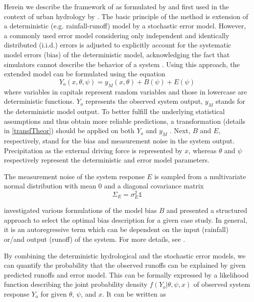 \documentclass{ctuthesis}\usepackage[]{graphicx}\usepackage[]{color}
\begin{document}
Herein we describe the framework of \cite{kennedy2001bayesian} as formulated by \cite{reichert2012linking} and first used in the context of urban hydrology by \cite{giudice2013improving}. The basic principle of the method is extension of a deterministic (e.g. rainfall-runoff) model by a stochastic error model. However, a commonly used error model considering only independent and identically distributed (i.i.d.) errors is adjusted to explicitly account for the systematic model errors (bias) of the deterministic model, acknowledging the fact that simulators cannot describe the  behavior of a system \citep{giudice2013improving}. Using this approach, the extended model can be formulated using the equation
\begin{equation} \label{eq:ext_model}
Y_o (x,\theta, \psi) = y_M (x, \theta) + B (\psi) + E (\psi)
\end{equation}
where variables in capitals represent random variables and those in lowercase are deterministic functions. $Y_o$ represents the observed system output, $y_M$ stands for the deterministic model output. To better fulfill the underlying statistical assumptions and thus obtain more reliable predictions, a transformation (details in \ref{transfTheor}) should be applied on both $Y_o$ and $y_M$ \citep{giudice2013improving}. Next, $B$ and $E$, respectively, stand for the bias and  measurement noise in the system output. Precipitation as the external driving force is represented by $x$, whereas $\theta$ and $\psi$ respectively represent the deterministic and error model parameters.  

The measurement noise of the system response $E$ is sampled from a multivariate normal distribution with mean 0 and a diagonal covariance matrix
\begin{equation}
\Sigma_E= \sigma_E^2 \mathds{1}
\end{equation}

\cite{giudice2013improving} investigated various formulations of the model bias $B$ and  presented a structured approach to select the optimal bias description
for a given case study. In general, it is an autoregressive term which can be dependent on the input (rainfall) or/and output (runoff) of the system. For more details, see \cite{giudice2013improving}.


By combining the deterministic hydrological and the stochastic error models, we can quantify the probability that the observed runoffs can be explained by given predicted runoffs and error model. This can be formally expressed by a likelihood function describing the joint probability density $f(Y_o|\theta, \psi, x)$ of observed system response $Y_o$ for given $\theta$, $\psi$, and $x$. It can be written as
\end{document}
